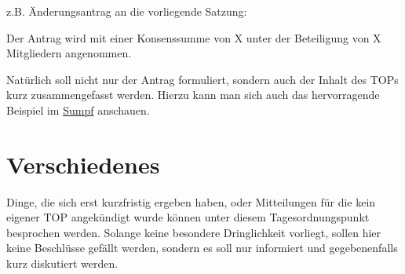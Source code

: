 \documentclass[fachschaft=physik]{mathphys/mathphys-protocol-experimental}
\begin{document}
z.B. Änderungsantrag an die vorliegende Satzung: %

Der Antrag wird mit einer Konsenssumme von X unter der Beteiligung von
X Mitgliedern angenommen. %

Natürlich soll nicht nur der Antrag formuliert, sondern auch der Inhalt des
TOPs kurz zusammengefasst werden. Hierzu kann man sich auch das hervorragende
Beispiel im \href{https://mathphys.fsk.uni-heidelberg.de/svn/sumpf/fsr/vorlagen/beispiel-sitzungsprotokoll}{Sumpf}
anschauen.

\section{Verschiedenes}
Dinge, die sich erst kurzfristig ergeben haben, oder Mitteilungen für die kein
eigener TOP angekündigt wurde können unter diesem Tagesordnungspunkt besprochen
werden. Solange keine besondere Dringlichkeit vorliegt, sollen hier keine
Beschlüsse gefällt werden, sondern es soll nur informiert und gegebenenfalls
kurz diskutiert werden.

\lipsum\lipsum
\end{document}
